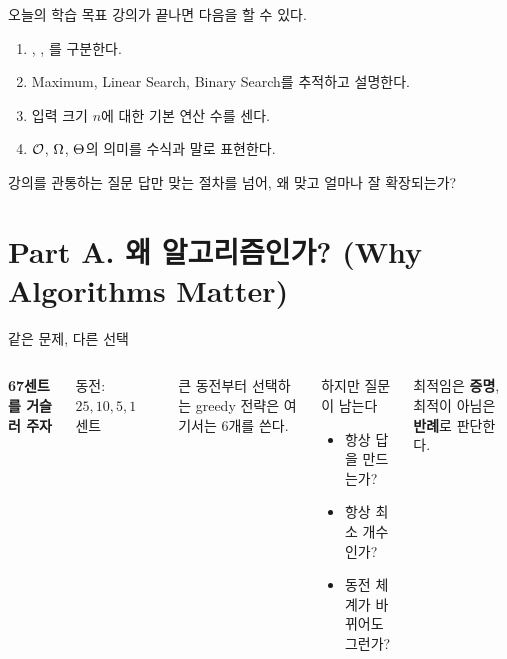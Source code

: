 \begin{frame}{오늘의 학습 목표}
  강의가 끝나면 다음을 할 수 있다.
  \begin{enumerate}
    \item {}, , 를 구분한다.
    \item Maximum, Linear Search, Binary Search를 추적하고 설명한다.
    \item 입력 크기 $n$에 대한 기본 연산 수를 센다.
    \item $\mathcal{O}$, $\Omega$, $\Theta$의 의미를 수식과 말로 표현한다.
  \end{enumerate}
  \vfill
  \begin{block}{강의를 관통하는 질문}
    답만 맞는 절차를 넘어, \alert{왜 맞고 얼마나 잘 확장되는가?}
  \end{block}
\end{frame}

\section{Part A. 왜 알고리즘인가? (Why Algorithms Matter)}

\begin{frame}{같은 문제, 다른 선택}
  \begin{columns}[T,onlytextwidth]
      \textbf{67센트를 거슬러 주자}\par
      동전: $25,10,5,1$센트
      \begin{center}
      \end{center}
      큰 동전부터 선택하는 greedy 전략은 여기서는 6개를 쓴다.
      \begin{alertblock}{하지만 질문이 남는다}
        \begin{itemize}
          \item 항상 답을 만드는가?
          \item 항상 최소 개수인가?
          \item 동전 체계가 바뀌어도 그런가?
        \end{itemize}
      \end{alertblock}
      최적임은 \textbf{증명}, 최적이 아님은 \textbf{반례}로 판단한다.
  \end{columns}
\end{frame}

